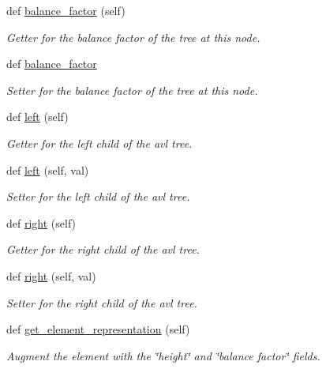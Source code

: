 \begin{DoxyCompactItemize}
def \hyperlink{classbridges_1_1avl__tree__element_1_1_a_v_l_tree_element_a44085ad5195b41ab0f552db065e43c9d}{balance\+\_\+factor} (self)
\begin{DoxyCompactList}\small\item\em Getter for the balance factor of the tree at this node. \end{DoxyCompactList}\item 
def \hyperlink{classbridges_1_1avl__tree__element_1_1_a_v_l_tree_element_abc448bdf8e9e494e148a8b70dbd02cbf}{balance\+\_\+factor}
\begin{DoxyCompactList}\small\item\em Setter for the balance factor of the tree at this node. \end{DoxyCompactList}\item 
def \hyperlink{classbridges_1_1avl__tree__element_1_1_a_v_l_tree_element_a717696b26736f5c9585fefc7c5ab88f1}{left} (self)
\begin{DoxyCompactList}\small\item\em Getter for the left child of the avl tree. \end{DoxyCompactList}\item 
def \hyperlink{classbridges_1_1avl__tree__element_1_1_a_v_l_tree_element_aa60894585b83e7cb526d8c10eca75a59}{left} (self, val)
\begin{DoxyCompactList}\small\item\em Setter for the left child of the avl tree. \end{DoxyCompactList}\item 
def \hyperlink{classbridges_1_1avl__tree__element_1_1_a_v_l_tree_element_aaab3b79617e7e503b1a7c28069d1eb15}{right} (self)
\begin{DoxyCompactList}\small\item\em Getter for the right child of the avl tree. \end{DoxyCompactList}\item 
def \hyperlink{classbridges_1_1avl__tree__element_1_1_a_v_l_tree_element_ad9b5962ea5c89c9b91d7767b1b258c8e}{right} (self, val)
\begin{DoxyCompactList}\small\item\em Setter for the right child of the avl tree. \end{DoxyCompactList}\item 
def \hyperlink{classbridges_1_1avl__tree__element_1_1_a_v_l_tree_element_a9c5d7ae75ec92d6ff208b56ebba710ca}{get\+\_\+element\+\_\+representation} (self)
\begin{DoxyCompactList}\small\item\em Augment the element with the \char`\"{}height\char`\"{} and \char`\"{}balance factor\char`\"{} fields. \end{DoxyCompactList}\end{DoxyCompactItemize}
